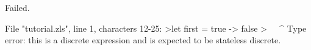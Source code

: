 \runverbatimfalse
{}
\begin{RunVerbatimMsg}
Failed.
\end{RunVerbatimMsg}
\begin{RunVerbatimErr}
File "tutorial.zls", line 1, characters 12-25:
>let first = true -> false
>            ^^^^^^^^^^^^^
Type error: this is a discrete expression and is expected to be stateless discrete.
\end{RunVerbatimErr}
